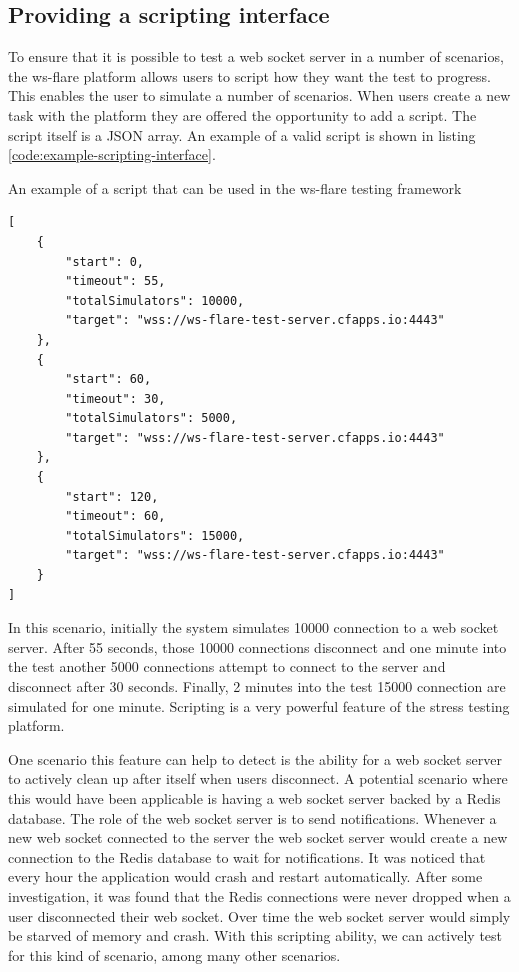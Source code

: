 \subsection{Providing a scripting interface}

To ensure that it is possible to test a web socket server in a number of scenarios, the ws-flare platform allows users to script how they want the test to progress. This enables the user to simulate a number of scenarios. When users create a new task with the platform they are offered the opportunity to add a script. The script itself is a JSON array. An example of a valid script is shown in listing \ref{code:example-scripting-interface}.

\begin{listing}[H]
    \caption{An example of a script that can be used in the ws-flare testing framework}
    \label{code:example-scripting-interface}
    \begin{verbatim}
[
    {
        "start": 0,
        "timeout": 55,
        "totalSimulators": 10000,
        "target": "wss://ws-flare-test-server.cfapps.io:4443"
    },
    {
        "start": 60,
        "timeout": 30,
        "totalSimulators": 5000,
        "target": "wss://ws-flare-test-server.cfapps.io:4443"
    },
    {
        "start": 120,
        "timeout": 60,
        "totalSimulators": 15000,
        "target": "wss://ws-flare-test-server.cfapps.io:4443"
    }
]
\end{verbatim}
\end{listing}

In this scenario, initially the system simulates 10000 connection to a web socket server. After 55 seconds, those 10000 connections disconnect and one minute into the test another 5000 connections attempt to connect to the server and disconnect after 30 seconds. Finally, 2 minutes into the test 15000 connection are simulated for one minute. Scripting is a very powerful feature of the stress testing platform. 

One scenario this feature can help to detect is the ability for a web socket server to actively clean up after itself when users disconnect. A potential scenario where this would have been applicable is having a web socket server backed by a Redis database. The role of the web socket server is to send notifications. Whenever a new web socket connected to the server the web socket server would create a new connection to the Redis database to wait for notifications. It was noticed that every hour the application would crash and restart automatically. After some investigation, it was found that the Redis connections were never dropped when a user disconnected their web socket. Over time the web socket server would simply be starved of memory and crash. With this scripting ability, we can actively test for this kind of scenario, among many other scenarios.

